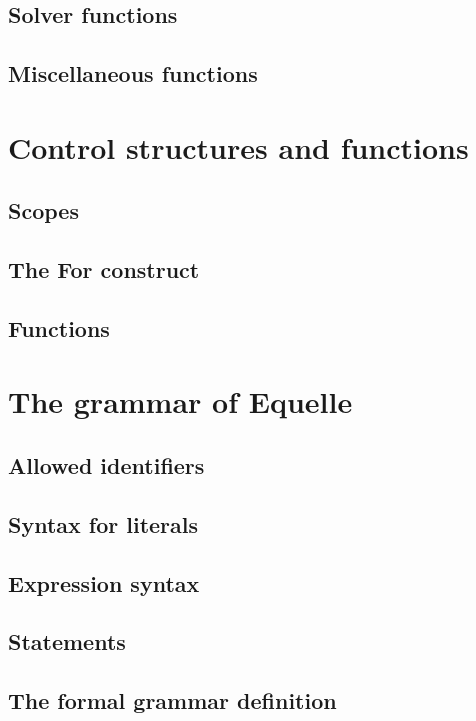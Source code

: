 \documentclass[11pt]{article}
\begin{document}
\subsection{Solver functions}

\subsection{Miscellaneous functions}

\section{Control structures and functions}

\subsection{Scopes}

\subsection{The For construct}

\subsection{Functions}


\section{The grammar of Equelle}

\subsection{Allowed identifiers}

\subsection{Syntax for literals}

\subsection{Expression syntax}

\subsection{Statements}

\subsection{The formal grammar definition}



\end{document}
